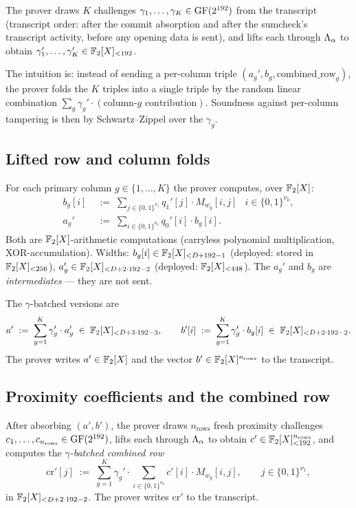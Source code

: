 The prover draws $K$ challenges $\gamma_1, \ldots, \gamma_K \in \mathrm{GF}(2^{192})$
from the transcript (transcript order: after the commit absorption
and after the sumcheck's transcript activity, before any opening data
is sent), and lifts each through $\Lambda_{\alpha}$ to obtain
$\gamma_1', \ldots, \gamma_K' \in \mathbb{F}_2[X]_{<192}$.

The intuition is: instead of sending a per-column triple
$(a_g', b_g, \mathrm{combined\_row}_g)$, the prover folds the $K$
triples into a single triple by the random linear combination
$\sum_g \gamma_g' \cdot (\text{column-}g\text{ contribution})$.
Soundness against per-column tampering is then by Schwartz–Zippel
over the $\gamma_g$.

\subsection{Lifted row and column folds}
\label{sec:folds}

For each primary column $g \in \{1, \ldots, K\}$ the prover computes,
over $\mathbb{F}_2[X]$:
\begin{align*}
  b_g[i] &\;:=\; \sum_{j \in \{0,1\}^{\nu_1}} q_1'[j] \cdot M_{w_g}[i, j]
    & i \in \{0,1\}^{\nu_0}, \\
  a_g' &\;:=\; \sum_{i \in \{0,1\}^{\nu_0}} q_0'[i] \cdot b_g[i].
\end{align*}
Both are $\mathbb{F}_2[X]$-arithmetic computations (carryless polynomial
multiplication, XOR-accumulation). Widths:
$b_g[i] \in \mathbb{F}_2[X]_{<D + 192 - 1}$ (deployed: stored in
$\mathbb{F}_2[X]_{<256}$), $a_g' \in \mathbb{F}_2[X]_{<D + 2 \cdot 192 - 2}$
(deployed: $\mathbb{F}_2[X]_{<448}$). The $a_g'$ and $b_g$ are
\emph{intermediates} — they are not sent.

The $\gamma$-batched versions are
\begin{equation}
  \label{eq:gamma-batch}
  a' \;:=\; \sum_{g=1}^{K} \gamma_g' \cdot a_g' \;\in\; \mathbb{F}_2[X]_{<D + 3\cdot 192 - 3},
  \qquad
  b'[i] \;:=\; \sum_{g=1}^{K} \gamma_g' \cdot b_g[i] \;\in\; \mathbb{F}_2[X]_{<D + 2\cdot 192 - 2}.
\end{equation}
The prover writes $a' \in \mathbb{F}_2[X]$ and the vector $b' \in
\mathbb{F}_2[X]^{n_{\mathrm{rows}}}$ to the transcript.

\subsection{Proximity coefficients and the combined row}

After absorbing $(a', b')$, the prover draws $n_{\mathrm{rows}}$
fresh proximity challenges $c_1, \ldots, c_{n_{\mathrm{rows}}} \in
\mathrm{GF}(2^{192})$, lifts each through $\Lambda_{\alpha}$ to obtain $c' \in
\mathbb{F}_2[X]_{<192}^{n_{\mathrm{rows}}}$, and computes the
\emph{$\gamma$-batched combined row}
\begin{equation}
  \label{eq:combined-row}
  \mathrm{cr}'[j] \;:=\; \sum_{g=1}^{K} \gamma_g' \cdot
    \sum_{i \in \{0,1\}^{\nu_0}} c'[i] \cdot M_{w_g}[i, j],
  \qquad j \in \{0,1\}^{\nu_1},
\end{equation}
in $\mathbb{F}_2[X]_{<D + 2 \cdot 192 - 2}$. The prover writes $\mathrm{cr}'$
to the transcript.

